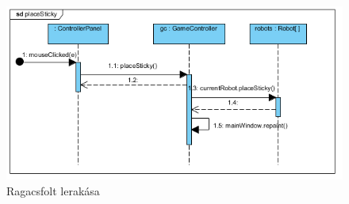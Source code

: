 \begin{figure}[h]
	\begin{center}
		\includegraphics[width=14cm]{chapters/chapter11/placesticky.png}
		\caption{Ragacsfolt lerakása}
		\label{fig:Grafika}
	\end{center}
\end{figure}
\clearpage

